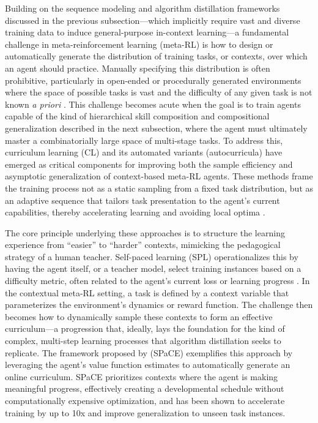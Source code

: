 \documentclass[11pt]{article}
\begin{document}
Building on the sequence modeling and algorithm distillation frameworks discussed in the previous subsection---which implicitly require vast and diverse training data to induce general-purpose in-context learning---a fundamental challenge in meta-reinforcement learning (meta-RL) is how to design or automatically generate the distribution of training tasks, or contexts, over which an agent should practice. Manually specifying this distribution is often prohibitive, particularly in open-ended or procedurally generated environments where the space of possible tasks is vast and the difficulty of any given task is not known \emph{a priori} \cite{ref199}. This challenge becomes acute when the goal is to train agents capable of the kind of hierarchical skill composition and compositional generalization described in the next subsection, where the agent must ultimately master a combinatorially large space of multi-stage tasks. To address this, curriculum learning (CL) and its automated variants (autocurricula) have emerged as critical components for improving both the sample efficiency and asymptotic generalization of context-based meta-RL agents. These methods frame the training process not as a static sampling from a fixed task distribution, but as an adaptive sequence that tailors task presentation to the agent's current capabilities, thereby accelerating learning and avoiding local optima \cite{ref201}.

The core principle underlying these approaches is to structure the learning experience from ``easier'' to ``harder'' contexts, mimicking the pedagogical strategy of a human teacher. Self-paced learning (SPL) operationalizes this by having the agent itself, or a teacher model, select training instances based on a difficulty metric, often related to the agent's current loss or learning progress \cite{ref370,ref371}. In the contextual meta-RL setting, a task is defined by a context variable that parameterizes the environment's dynamics or reward function. The challenge then becomes how to dynamically sample these contexts to form an effective curriculum---a progression that, ideally, lays the foundation for the kind of complex, multi-step learning processes that algorithm distillation seeks to replicate. The framework proposed by \cite{ref372} (SPaCE) exemplifies this approach by leveraging the agent's value function estimates to automatically generate an online curriculum. SPaCE prioritizes contexts where the agent is making meaningful progress, effectively creating a developmental schedule without computationally expensive optimization, and has been shown to accelerate training by up to 10x and improve generalization to unseen task instances.
\end{document}
